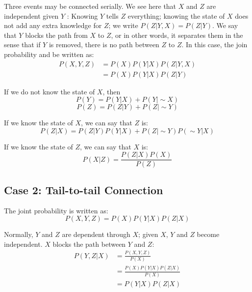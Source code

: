 \begin{multicols*}{2}
\noindent Three events may be connected serially. We see here that $X$ and $Z$ are independent given $Y$ : Knowing $Y$ tells $Z$ everything; knowing the state of $X$ does not add any extra knowledge for $Z$; we write $P(Z|Y,X) = P(Z|Y)$. We say that $Y$ blocks the path from $X$ to $Z$, or in other words, it separates them in the sense that if $Y$ is removed, there is no path between $Z$ to $Z$. In this case, the join probability and be written as:
\begin{equation*}
\begin{split}
    P(X,Y,Z) &= P(X) P(Y|X) P(Z|Y,X)\\
    &= P(X) P(Y|X) P(Z|Y)
\end{split}
\end{equation*}

\noindent If we do not know the state of $X$, then
$$P(Y) = P(Y|X) + P(Y|\sim X)$$
$$P(Z) = P(Z|Y) + P(Z|\sim Y)$$

\noindent If we know the state of $X$, we can say that $Z$ is:
$$P(Z|X) = P(Z|Y)P(Y|X)+P(Z|\sim Y)P(\sim Y|X)$$

\noindent If we know the state of $Z$, we can say that $X$ is:
$$P(X|Z) = \frac{P(Z|X)P(X)}{P(Z)}$$

\subsection{Case 2: Tail-to-tail Connection}

\begin{center}
\end{center}

\noindent The joint probability is written as:
$$P(X,Y,Z) = P(X) P(Y|X) P(Z|X)$$

\noindent Normally, $Y$ and $Z$ are dependent through $X$; given $X$, $Y$ and $Z$ become independent. $X$ blocks the path between $Y$ and $Z$:
\begin{equation*}
\begin{split}
    P(Y,Z|X) &= \frac{P(X,Y,Z)}{P(X)} \\
    &= \frac{P(X) P(Y|X) P(Z|X)}{P(X)} \\
    &= P(Y|X) P(Z|X)
\end{split}
\end{equation*}


\end{multicols*}
